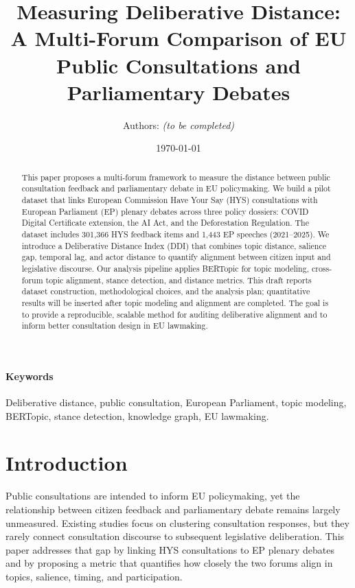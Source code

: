 \documentclass[11pt,a4paper]{article}
\title{Measuring Deliberative Distance: A Multi-Forum Comparison of EU Public Consultations and Parliamentary Debates}
\author{Authors: \textit{(to be completed)}}
\date{\today}
\begin{document}
\maketitle

\tableofcontents

\begin{abstract}
This paper proposes a multi-forum framework to measure the distance between public consultation feedback and parliamentary debate in EU policymaking. We build a pilot dataset that links European Commission Have Your Say (HYS) consultations with European Parliament (EP) plenary debates across three policy dossiers: COVID Digital Certificate extension, the AI Act, and the Deforestation Regulation. The dataset includes 301,366 HYS feedback items and 1,443 EP speeches (2021--2025). We introduce a Deliberative Distance Index (DDI) that combines topic distance, salience gap, temporal lag, and actor distance to quantify alignment between citizen input and legislative discourse. Our analysis pipeline applies BERTopic for topic modeling, cross-forum topic alignment, stance detection, and distance metrics. This draft reports dataset construction, methodological choices, and the analysis plan; quantitative results will be inserted after topic modeling and alignment are completed. The goal is to provide a reproducible, scalable method for auditing deliberative alignment and to inform better consultation design in EU lawmaking.
\end{abstract}

\paragraph{Keywords} Deliberative distance, public consultation, European Parliament, topic modeling, BERTopic, stance detection, knowledge graph, EU lawmaking.

\section{Introduction}
Public consultations are intended to inform EU policymaking, yet the relationship between citizen feedback and parliamentary debate remains largely unmeasured. Existing studies focus on clustering consultation responses, but they rarely connect consultation discourse to subsequent legislative deliberation. This paper addresses that gap by linking HYS consultations to EP plenary debates and by proposing a metric that quantifies how closely the two forums align in topics, salience, timing, and participation.
\end{document}
